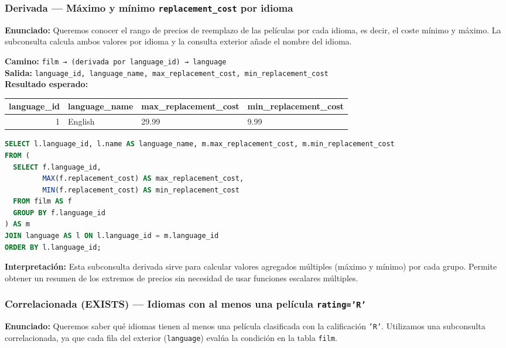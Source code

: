 \documentclass[12pt,a4paper]{article}
\begin{document}
\subsubsection*{Derivada — Máximo y mínimo \texttt{replacement\_cost} por idioma}
\textbf{Enunciado:}  
Queremos conocer el rango de precios de reemplazo de las películas por cada idioma, es decir, el coste mínimo y máximo.  
La subconsulta calcula ambos valores por idioma y la consulta exterior añade el nombre del idioma.

\textbf{Camino:} \texttt{film → (derivada por language\_id) → language}\\
\textbf{Salida:} \texttt{language\_id, language\_name, max\_replacement\_cost, min\_replacement\_cost}\\

\textbf{Resultado esperado:}

\begin{center}
\begin{tabular}{rlll}
\toprule
\textbf{language\_id} & \textbf{language\_name} & \textbf{max\_replacement\_cost} & \textbf{min\_replacement\_cost} \\
\midrule
1 & English & 29.99 & 9.99 \\
\bottomrule
\end{tabular}
\end{center}

\begin{lstlisting}[language=SQL]
SELECT l.language_id, l.name AS language_name, m.max_replacement_cost, m.min_replacement_cost
FROM (
  SELECT f.language_id,
         MAX(f.replacement_cost) AS max_replacement_cost,
         MIN(f.replacement_cost) AS min_replacement_cost
  FROM film AS f
  GROUP BY f.language_id
) AS m
JOIN language AS l ON l.language_id = m.language_id
ORDER BY l.language_id;
\end{lstlisting}

\vspace{0.5em}
\textbf{Interpretación:}  
Esta subconsulta derivada sirve para calcular valores agregados múltiples (máximo y mínimo) por cada grupo.  
Permite obtener un resumen de los extremos de precios sin necesidad de usar funciones escalares múltiples.

\subsubsection*{Correlacionada (EXISTS) — Idiomas con al menos una película \texttt{rating='R'}}
\textbf{Enunciado:}  
Queremos saber qué idiomas tienen al menos una película clasificada con la calificación \texttt{'R'}.  
Utilizamos una subconsulta correlacionada, ya que cada fila del exterior (\texttt{language}) evalúa la condición en la tabla \texttt{film}.
\end{document}
